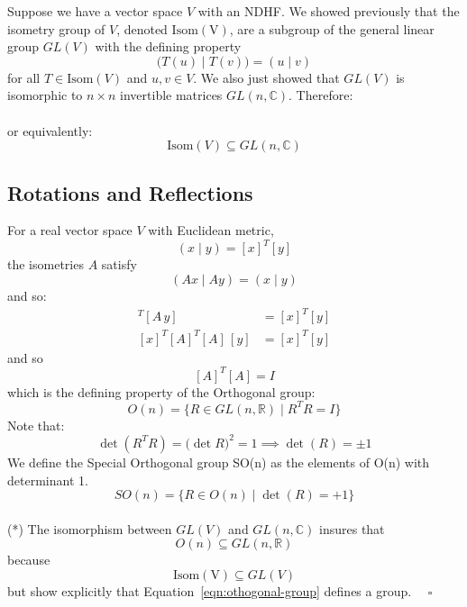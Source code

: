 \documentclass[12pt]{article}
\begin{document}
Suppose we have a vector space $V$ with an NDHF. We showed previously
that the isometry group of $V$, denoted $\mathrm{Isom(V)}$, are a
subgroup of the general linear group $GL(V)$ with the defining
property
$$\bigl( T(u) \mid T(v) \bigr) = (u \mid v)$$ for all $T \in
\mathrm{Isom}(V)$ and $u,v \in V$.  We also just showed that $GL(V)$
is isomorphic to $n \times n$ invertible matrices $GL(n,\mathbb{C})$.
Therefore:\\
\medskip
\noindent{}\\
or equivalently:
$$\mathrm{Isom}(V) \subseteq GL(n,\mathbb{C})$$

\subsection*{Rotations and Reflections}

For a real vector space $V$ with Euclidean metric,
$$(x \mid y) = [x]^T [y]$$
the isometries $A$ satisfy
$$(Ax \mid Ay) = (x \mid y)$$
and so:
\begin{align*}
  [A\,x]^T[A\,y] &= [x]^T[y] \\
  [x]^T [A]^T [A]\,[y] &= [x]^T[y]
\end{align*}
and so
\begin{equation}
  \label{eqn:othogonal-group}  
  [A]^T [A] = I
\end{equation}
which is the defining property of the Orthogonal group:
\begin{equation*}
  O(n) = \bigl\{R \in GL(n,\mathbb{R}) \mid R^T R = I\bigr\}
\end{equation*}
Note that:
\begin{equation*}
  \det(R^T R) = \bigl(\det R\bigr)^2 = 1 \implies \det(R) = \pm 1
\end{equation*}
We define the Special Orthogonal group SO(n) as the elements of O(n) with determinant 1.
\begin{equation*}
  SO(n) = \bigl\{R \in O(n) \mid \det(R) = +1 \bigr\}
\end{equation*}
\\[3pt]

\exercise (*) The isomorphism between $GL(V)$ and $GL(n,\mathbb{C})$
insures that
$$O(n) \subseteq GL(n,\mathbb{R})$$
because
$$\mathrm{Isom(V)} \subseteq GL(V)$$
but show explicitly that Equation~\ref{eqn:othogonal-group} defines a group.
$\quad \square$\\[5pt]
\end{document}
